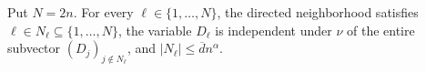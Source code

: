 Put \(N=2n\).  For every \(\ell\in\{1,\ldots,N\}\), the directed neighborhood satisfies \(\ell\in N_\ell\subseteq\{1,\ldots,N\}\), the variable \(D_\ell\) is independent under \(\nu\) of the entire subvector \((D_j)_{j\notin N_\ell}\), and \(\lvert N_\ell\rvert\le\overline d n^\alpha\).